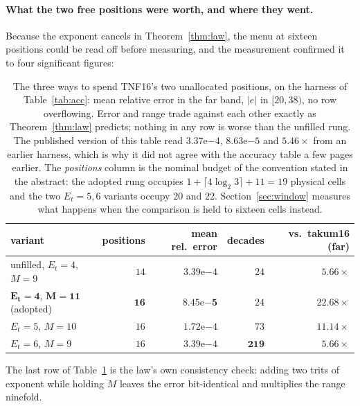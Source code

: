 \documentclass[11pt]{article}
\theoremstyle{definition}
\begin{document}
\paragraph{What the two free positions were worth, and where they went.} Because
the exponent cancels in Theorem~\ref{thm:law}, the menu at sixteen positions could
be read off before measuring, and the measurement confirmed it to four significant
figures:

\begin{table}[t]\centering
\caption{The three ways to spend TNF16's two unallocated positions, on the
harness of Table~\ref{tab:acc}: mean relative error in the far band, $|e|$ in
$[20,38)$, no row overflowing. Error and range trade against each other exactly
as Theorem~\ref{thm:law} predicts; nothing in any row is worse than the unfilled
rung. The published version of this table read $3.37\mathrm{e}{-4}$,
$8.63\mathrm{e}{-5}$ and $5.46\times$ from an earlier harness, which is why it did
not agree with the accuracy table a few pages earlier. The \emph{positions} column
is the nominal budget of the convention stated in the abstract: the adopted rung occupies
$1+\lceil 4\log_2 3\rceil+11=19$ physical cells and the two $E_t{=}5,6$ variants
occupy $20$ and $22$. Section~\ref{sec:window} measures what happens when the
comparison is held to sixteen cells instead.}
\label{tab:tnf16-fill}
\begin{tabular}{lrrrr}
\toprule
variant & positions & mean rel.\ error & decades & vs.\ takum16 (far) \\
\midrule
unfilled, $E_t{=}4$, $M{=}9$  & $14$ & $3.39\mathrm{e}{-4}$ & $24$  & $5.66\times$ \\
$\mathbf{E_t{=}4}$, $\mathbf{M{=}11}$ (adopted) & $\mathbf{16}$ & $\mathbf{8.45\mathrm{e}{-5}}$ & $24$ & $\mathbf{22.68\times}$ \\
$E_t{=}5$, $M{=}10$           & $16$ & $1.72\mathrm{e}{-4}$ & $73$  & $11.14\times$ \\
$E_t{=}6$, $M{=}9$            & $16$ & $3.39\mathrm{e}{-4}$ & $\mathbf{219}$ & $5.66\times$ \\
\bottomrule
\end{tabular}
\end{table}

The last row of Table~\ref{tab:tnf16-fill} is the law's own consistency check:
adding two trits of exponent
while holding $M$ leaves the error bit-identical and multiplies the range
ninefold.
\end{document}
